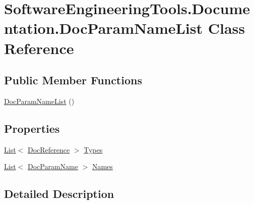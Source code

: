 \hypertarget{class_software_engineering_tools_1_1_documentation_1_1_doc_param_name_list}{\section{Software\+Engineering\+Tools.\+Documentation.\+Doc\+Param\+Name\+List Class Reference}
\label{class_software_engineering_tools_1_1_documentation_1_1_doc_param_name_list}
}
\subsection*{Public Member Functions}
\begin{DoxyCompactItemize}
\item 
\hyperlink{class_software_engineering_tools_1_1_documentation_1_1_doc_param_name_list_aadacd4e56816fe6f8f7482c2d0dd45cc}{Doc\+Param\+Name\+List} ()
\end{DoxyCompactItemize}
\subsection*{Properties}
\begin{DoxyCompactItemize}
\item 
\hyperlink{namespace_software_engineering_tools_1_1_documentation_ae0bccf4f49a76db084c1c316e5954ec9a4ee29ca12c7d126654bd0e5275de6135}{List}$<$ \hyperlink{class_software_engineering_tools_1_1_documentation_1_1_doc_reference}{Doc\+Reference} $>$ \hyperlink{class_software_engineering_tools_1_1_documentation_1_1_doc_param_name_list_a75bc981d62487ee28dad2b03813142e5}{Types}
\item 
\hyperlink{namespace_software_engineering_tools_1_1_documentation_ae0bccf4f49a76db084c1c316e5954ec9a4ee29ca12c7d126654bd0e5275de6135}{List}$<$ \hyperlink{class_software_engineering_tools_1_1_documentation_1_1_doc_param_name}{Doc\+Param\+Name} $>$ \hyperlink{class_software_engineering_tools_1_1_documentation_1_1_doc_param_name_list_aa90f33ac2bc4890276fd27b2c1fa8ddd}{Names}
\end{DoxyCompactItemize}


\subsection{Detailed Description}


